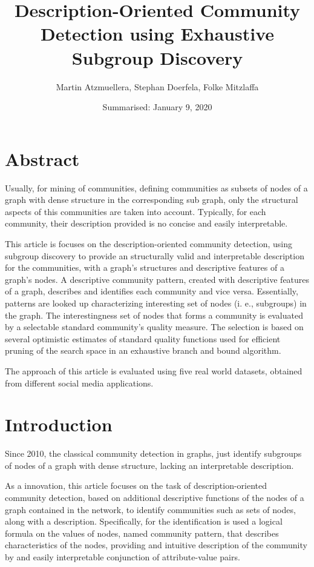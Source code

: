 \documentclass[a4paper]{article}
\title{Description-Oriented Community Detection using Exhaustive Subgroup Discovery}
\date{Summarised: January 9, 2020}
\author{Martin Atzmuellera, Stephan Doerfela, Folke Mitzlaffa}
\begin{document}
\maketitle
\section{Abstract}
Usually, for mining of communities, defining communities as subsets of nodes of a graph with dense structure in the corresponding sub graph, only the structural aspects of this communities are taken into account. Typically, for each community, their description provided is no concise and easily interpretable. 
\vskip 0.3cm

This article is focuses on the description-oriented community detection, using subgroup discovery to provide an structurally valid and interpretable description for the communities, with a graph's structures and descriptive features of a graph’s nodes. A descriptive community pattern, created with descriptive features of a graph, describes and identifies each community and vice versa. Essentially, patterns are looked up characterizing interesting set of nodes (i. e., subgroups) in the graph. The interestingness set of nodes that forms a community is evaluated by a selectable standard community's quality measure. The selection is based on several optimistic estimates of standard quality functions used for efficient pruning of the search space in an exhaustive branch and bound algorithm. 
\vskip 0.3cm

The approach of this article is evaluated using five real world datasets, obtained from different social media applications.

\section{Introduction}
Since 2010, the classical community detection in graphs, just identify subgroups of nodes of a graph with dense structure, lacking an interpretable description.
\vskip 0.3cm

As a innovation, this article focuses on the task of description-oriented community detection, based on additional descriptive functions of the nodes of a graph contained in the network, to identify communities such as sets of nodes, along with a description. Specifically, for the identification is used a logical formula on the values of nodes, named community pattern, that describes characteristics of the nodes, providing and intuitive description of the community by and easily interpretable conjunction of attribute-value pairs.
\vskip 0.3cm
\end{document}

